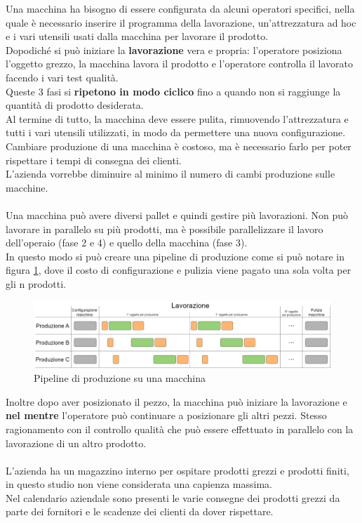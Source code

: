 Una macchina ha bisogno di essere configurata da alcuni operatori specifici, nella quale è necessario inserire il programma della lavorazione, un'attrezzatura ad hoc e i vari utensili usati dalla macchina per lavorare il prodotto.\\
Dopodiché si può iniziare la \textbf{lavorazione} vera e propria: l'operatore posiziona l'oggetto grezzo, la macchina lavora il prodotto e l'operatore controlla il lavorato facendo i vari test qualità.\\
Queste 3 fasi si \textbf{ripetono in modo ciclico} fino a quando non si raggiunge la quantità di prodotto desiderata.\\
Al termine di tutto, la macchina deve essere pulita, rimuovendo l'attrezzatura e tutti i vari utensili utilizzati, in modo da permettere una nuova configurazione.\\
Cambiare produzione di una macchina è costoso, ma è necessario farlo per poter rispettare i tempi di consegna dei clienti.\\
L'azienda vorrebbe diminuire al minimo il numero di cambi produzione sulle macchine.
\\ \\
Una macchina può avere diversi pallet e quindi gestire più lavorazioni. Non può lavorare in parallelo su più prodotti, ma è possibile parallelizzare il lavoro dell'operaio (fase 2 e 4) e quello della macchina (fase 3).\\
In questo modo si può creare una pipeline di produzione come si può notare in figura \ref{fig:pipeline_di_produzione}, dove il costo di configurazione e pulizia viene pagato una sola volta per gli n prodotti.
\begin{figure}[H]
    \centering
    \includegraphics[width=\textwidth]{media/pipeline.drawio.png}
    \caption{Pipeline di produzione su una macchina}
    \label{fig:pipeline_di_produzione}
\end{figure}
Inoltre dopo aver posizionato il pezzo, la macchina può iniziare la lavorazione e \textbf{nel mentre} l'operatore può continuare a posizionare gli altri pezzi. 
Stesso ragionamento con il controllo qualità che può essere effettuato in parallelo con la lavorazione di un altro prodotto.\\ \\
L'azienda ha un magazzino interno per ospitare prodotti grezzi e prodotti finiti, in questo studio non viene considerata una capienza massima.\\
Nel calendario aziendale sono presenti le varie consegne dei prodotti grezzi da parte dei fornitori e le scadenze dei clienti da dover rispettare.\\

